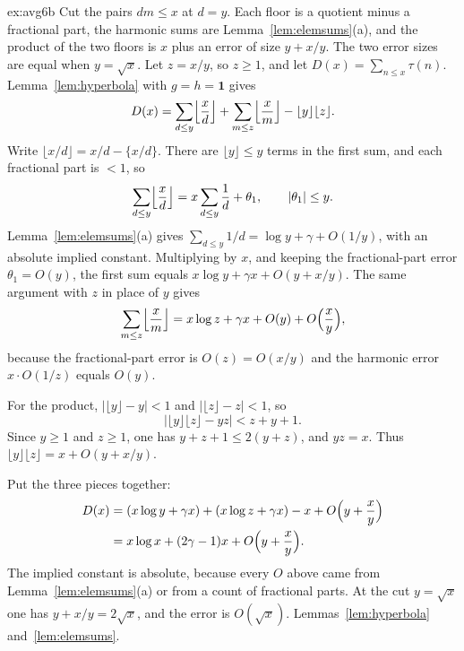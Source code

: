 \begin{solution}{ex:avg6b}
\idea Cut the pairs $dm\le x$ at $d=y$. Each floor is a quotient minus a fractional part, the harmonic sums are Lemma~\ref{lem:elemsums}(a), and the product of the two floors is $x$ plus an error of size $y+x/y$. The two error sizes are equal when $y=\sqrt x$.
\writeup Let $z=x/y$, so $z\ge1$, and let $D(x)=\sum_{n\le x}\tau(n)$. Lemma~\ref{lem:hyperbola} with $g=h=\mathbf1$ gives
\[
D(x)=\sum_{d\le y}\Bigl\lfloor\frac xd\Bigr\rfloor+\sum_{m\le z}\Bigl\lfloor\frac xm\Bigr\rfloor-\lfloor y\rfloor\lfloor z\rfloor.
\]
Write $\lfloor x/d\rfloor=x/d-\{x/d\}$. There are $\lfloor y\rfloor\le y$ terms in the first sum, and each fractional part is $<1$, so
\[
\sum_{d\le y}\Bigl\lfloor\frac xd\Bigr\rfloor=x\sum_{d\le y}\frac1d+\theta_1,\qquad |\theta_1|\le y.
\]
Lemma~\ref{lem:elemsums}(a) gives $\sum_{d\le y}1/d=\log y+\gamma+O(1/y)$, with an absolute implied constant. Multiplying by $x$, and keeping the fractional-part error $\theta_1=O(y)$, the first sum equals $x\log y+\gamma x+O(y+x/y)$. The same argument with $z$ in place of $y$ gives
\[
\sum_{m\le z}\Bigl\lfloor\frac xm\Bigr\rfloor=x\log z+\gamma x+O(y)+O\Bigl(\frac xy\Bigr),
\]
because the fractional-part error is $O(z)=O(x/y)$ and the harmonic error $x\cdot O(1/z)$ equals $O(y)$.

For the product, $|\lfloor y\rfloor-y|<1$ and $|\lfloor z\rfloor-z|<1$, so
\[
\bigl|\lfloor y\rfloor\lfloor z\rfloor-yz\bigr|<z+y+1.
\]
Since $y\ge1$ and $z\ge1$, one has $y+z+1\le2(y+z)$, and $yz=x$. Thus $\lfloor y\rfloor\lfloor z\rfloor=x+O(y+x/y)$.

Put the three pieces together:
\begin{align*}
D(x)&=(x\log y+\gamma x)+(x\log z+\gamma x)-x+O\Bigl(y+\frac xy\Bigr)\\
&=x\log x+(2\gamma-1)x+O\Bigl(y+\frac xy\Bigr).
\end{align*}
The implied constant is absolute, because every $O$ above came from Lemma~\ref{lem:elemsums}(a) or from a count of fractional parts. At the cut $y=\sqrt x$ one has $y+x/y=2\sqrt x$, and the error is $O(\sqrt x)$.
\tools Lemmas~\ref{lem:hyperbola} and~\ref{lem:elemsums}.
\end{solution}

